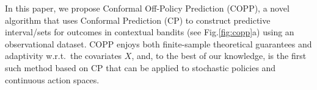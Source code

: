 In this paper, we propose Conformal Off-Policy Prediction (COPP), a novel algorithm that uses Conformal Prediction (CP) \citep{vovk2005algorithmic} to construct predictive interval/sets for outcomes in contextual bandits (see Fig.\ref{fig:copp}a) using an observational dataset.
COPP enjoys both finite-sample theoretical guarantees and adaptivity w.r.t.\ the covariates $X$, and, to the best of our knowledge, is the first such method based on CP that can be applied to stochastic policies and continuous action spaces.


